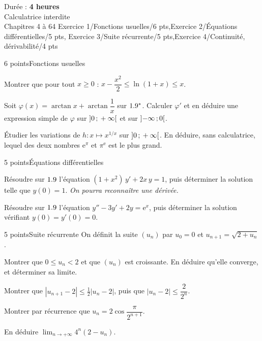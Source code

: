 
  {Durée : \textbf{4 heures}\\Calculatrice interdite\\Chapitres 4 à 6}{4}
  {Exercice 1/Fonctions usuelles/6 pts,Exercice 2/Équations différentielles/5 pts,%
   Exercice 3/Suite récurrente/5 pts,Exercice 4/{Continuité, dérivabilité}/4 pts}

\begin{exoEval}{6 points}{Fonctions usuelles}
\begin{questions}
  \item Montrer que pour tout $x\geqslant0$ :
    $x-\dfrac{x^{2}}{2}\leqslant\ln(1+x)\leqslant x$.
  \item Soit $\varphi(x)=\arctan x+\arctan\dfrac1x$ sur $1.9^{*}$. Calculer
    $\varphi'$ et en déduire une expression simple de $\varphi$ sur
    $\mathopen{]}0\,{;}\,+\infty\mathclose{[}$ et sur $\mathopen{]}-\infty\,{;}\,0\mathclose{[}$.
  \item Étudier les variations de $h:x\mapsto x^{1/x}$ sur
    $\mathopen{]}0\,{;}\,+\infty\mathclose{[}$. En déduire, sans calculatrice, lequel des deux
    nombres $\mathrm{e}^{\pi}$ et $\pi^{\mathrm{e}}$ est le plus grand.
\end{questions}
\end{exoEval}

\begin{exoEval}{5 points}{Équations différentielles}
\begin{questions}
  \item Résoudre sur $1.9$ l'équation $(1+x^{2})\,y'+2x\,y=1$, puis
    déterminer la solution telle que $y(0)=1$. \emph{On pourra
    reconnaître une dérivée.}
  \item Résoudre sur $1.9$ l'équation $y''-3y'+2y=\mathrm{e}^{x}$, puis
    déterminer la solution vérifiant $y(0)=y'(0)=0$.
\end{questions}
\end{exoEval}

\begin{exoEval}{5 points}{Suite récurrente}
On définit la suite $(u_n)$ par $u_0=0$ et $u_{n+1}=\sqrt{2+u_n}$.
\begin{questions}
  \item Montrer que $0\leqslant u_n<2$ et que $(u_n)$ est croissante. En
    déduire qu'elle converge, et déterminer sa limite.
  \item Montrer que $|u_{n+1}-2|\leqslant\frac12|u_n-2|$, puis que
    $|u_n-2|\leqslant\dfrac{2}{2^{n}}$.
  \item Montrer par récurrence que $u_n=2\cos\dfrac{\pi}{2^{n+1}}$.
  \item En déduire $\displaystyle\lim_{n\to+\infty}4^{n}(2-u_n)$.
\end{questions}
\end{exoEval}

